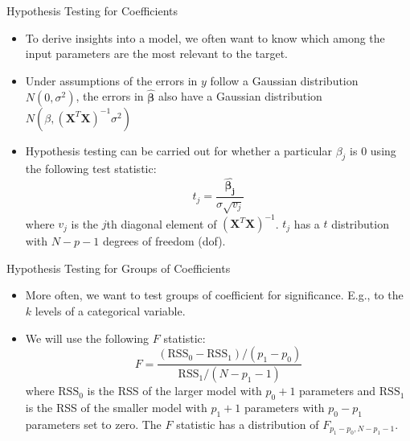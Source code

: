 \documentclass[aspectratio=169]{beamer}
\let \vec \mathbf
\begin{document}
\begin{frame}{Hypothesis Testing for Coefficients}
    \begin{itemize}
        \item To derive insights into a model, we often want to know which among the input parameters are the most relevant to the target.
        \item Under assumptions of the errors in $y$ follow a Gaussian distribution $N(0, \sigma^2)$, the errors in $\hat{\bm{\beta}}$ also have a Gaussian distribution $N(\beta, (\vec{X}^T \vec{X})^{-1} \sigma^2)$
        \item Hypothesis testing can be carried out for whether a particular $\beta_j$ is 0 using the following test statistic:
        \begin{equation*}
        t_j = \frac{\hat{\bm{\beta_j}}}{\sigma\sqrt{v_j}}
        \end{equation*}
        where $v_j$ is the $j$th diagonal element of $(\vec{X}^T \vec{X})^{-1}$. $t_j$ has a $t$ distribution with $N-p-1$ degrees of freedom (dof).
    \end{itemize}
\end{frame}


\begin{frame}{Hypothesis Testing for Groups of Coefficients}
    \begin{itemize}
        \item More often, we want to test groups of coefficient for significance. E.g., to the $k$ levels of a categorical variable.
        \item We will use the following $F$ statistic:
        \begin{equation*}
        F = \frac{(\mathrm{RSS}_0 - \mathrm{RSS}_1)/(p_1-p_0)}{\mathrm{RSS}_1/(N-p_1-1)}
        \end{equation*}
        where $\mathrm{RSS}_0$ is the RSS of the larger model with $p_0 + 1$ parameters and $\mathrm{RSS}_1$ is the RSS of the smaller model with $p_1 + 1$ parameters with $p_0 - p_1$ parameters set to zero. The $F$ statistic has a distribution of $F_{p_1-p_0,N-p_1-1}$.
    \end{itemize}
\end{frame}
\end{document}
